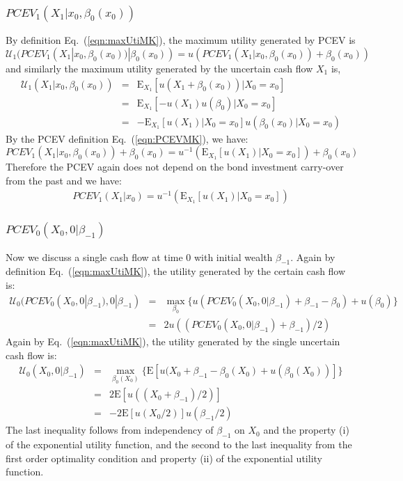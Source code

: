 \documentclass{article}[12pt letter]
\newcommand{\E}{\mathrm{E}}
\begin{document}
\subsubsection{$PCEV_1(X_1|x_0,\beta_0(x_0))$}
By definition Eq.~(\ref{eqn:maxUtiMK}), the maximum utility generated by PCEV is
\[\mathcal{U}_1(PCEV_1(X_1|x_0,\beta_0(x_0))|\beta_0(x_0)) = u(PCEV_1(X_1|x_0,\beta_0(x_0)) + \beta_0(x_0))\]
and similarly the maximum utility generated by the uncertain cash flow $X_1$ is,
\begin{eqnarray*}
\mathcal{U}_1(X_1|x_0,\beta_0(x_0)) &=& \E_{X_1}[u(X_1 + \beta_0(x_0))|X_0=x_0]\\
&=&\E_{X_1}[-u(X_1)u(\beta_0)|X_0=x_0]\\
&=&-\E_{X_1}[u(X_1)|X_0=x_0]u(\beta_0(x_0)|X_0=x_0)
\end{eqnarray*}
By the PCEV definition Eq.~(\ref{eqn:PCEVMK}), we have:
\[PCEV_1(X_1|x_0,\beta_0(x_0)) + \beta_0(x_0) = u^{-1}(\E_{X_1}[u(X_1)|X_0=x_0]) + \beta_0(x_0)\]
Therefore the PCEV again does not depend on the bond investment carry-over from the past and we have:
\begin{align}\label{eqn:MKLast}
PCEV_1(X_1|x_0) =u^{-1}(\E_{X_1}[u(X_1)|X_0=x_0])
\end{align}
\subsubsection{$PCEV_0(X_0, 0|\beta_{-1})$}

Now we discuss a single cash flow at time 0 with initial wealth $\beta_{-1}$. Again by definition Eq.~(\ref{eqn:maxUtiMK}), the utility generated by the certain cash flow is:
\begin{eqnarray*}
\mathcal{U}_0(PCEV_0(X_0,0|\beta_{-1}),0|\beta_{-1}) &=& \max_{\beta_0}\{u(PCEV_0(X_0,0|\beta_{-1})+\beta_{-1}-\beta_0)+u(\beta_0)\}\\
&=& 2u((PCEV_0(X_0,0|\beta_{-1})+ \beta_{-1})/2)
\end{eqnarray*}
Again by Eq.~(\ref{eqn:maxUtiMK}), the utility generated by the single uncertain cash flow is:
\begin{eqnarray*}
\mathcal{U}_0(X_0,0|\beta_{-1}) &=& \max_{\beta_0(X_0)} \{\E[u(X_0 + \beta_{-1}-\beta_0(X_0) + u(\beta_0(X_0)) ]\} \\
&=& 2\E[u((X_0+\beta_{-1})/2)]\\
&=& -2\E[u(X_0/2)]u(\beta_{-1}/2)
\end{eqnarray*}
The last inequality follows from independency of $\beta_{-1}$ on $X_0$ and the property (i) of the exponential utility function, and  the second to the last inequality from the first order optimality condition and property (ii) of the exponential utility function.
\end{document}
